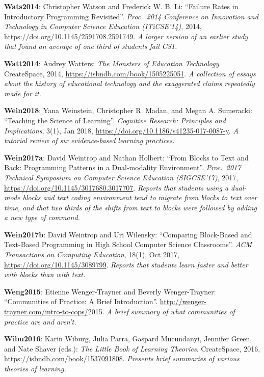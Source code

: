 \textbf{\hypertarget{b:Wats2014}{Wats2014}\label{b:Wats2014}}: Christopher Watson and Frederick W. B. Li: ``Failure Rates in Introductory Programming Revisited''. \emph{Proc.\ 2014 Conference on Innovation and Technology in Computer Science Education (ITiCSE'14)}, 2014, \url{https://doi.org/10.1145/2591708.2591749}. \emph{A larger version of an earlier study that found an average of one third of students fail CS1.}

\textbf{\hypertarget{b:Watt2014}{Watt2014}\label{b:Watt2014}}: Audrey Watters: \emph{The Monsters of Education Technology}. CreateSpace, 2014, \url{https://isbndb.com/book/1505225051}. \emph{A collection of essays about the history of educational technology and the exaggerated claims repeatedly made for it.}

\textbf{\hypertarget{b:Wein2018}{Wein2018}\label{b:Wein2018}}: Yana Weinstein, Christopher R. Madan, and Megan A. Sumeracki: ``Teaching the Science of Learning''. \emph{Cognitive Research: Principles and Implications}, 3(1), Jan 2018, \url{https://doi.org/10.1186/s41235-017-0087-y}. \emph{A tutorial review of six evidence-based learning practices.}

\textbf{\hypertarget{b:Wein2017a}{Wein2017a}\label{b:Wein2017a}}: David Weintrop and Nathan Holbert: ``From Blocks to Text and Back: Programming Patterns in a Dual-modality Environment''. \emph{Proc.\ 2017 Technical Symposium on Computer Science Education (SIGCSE'17)}, 2017, \url{https://doi.org/10.1145/3017680.3017707}. \emph{Reports that students using a dual-mode blocks and text coding environment tend to migrate from blocks to text over time, and that two thirds of the shifts from text to blocks were followed by adding a new type of command.}

\textbf{\hypertarget{b:Wein2017b}{Wein2017b}\label{b:Wein2017b}}: David Weintrop and Uri Wilensky: ``Comparing Block-Based and Text-Based Programming in High School Computer Science Classrooms''. \emph{ACM Transactions on Computing Education}, 18(1), Oct 2017, \url{https://doi.org/10.1145/3089799}. \emph{Reports that students learn faster and better with blocks than with text.}

\textbf{\hypertarget{b:Weng2015}{Weng2015}\label{b:Weng2015}}: Etienne Wenger-Trayner and Beverly Wenger-Trayner: ``Communities of Practice: A Brief Introduction''. \url{http://wenger-trayner.com/intro-to-cops/}2015. \emph{A brief summary of what communities of practice are and aren't.}

\textbf{\hypertarget{b:Wibu2016}{Wibu2016}\label{b:Wibu2016}}: Karin Wiburg, Julia Parra, Gaspard Mucundanyi, Jennifer Green, and Nate Shaver (eds.): \emph{The Little Book of Learning Theories}. CreateSpace, 2016, \url{https://isbndb.com/book/1537091808}. \emph{Presents brief summaries of various theories of learning.}

